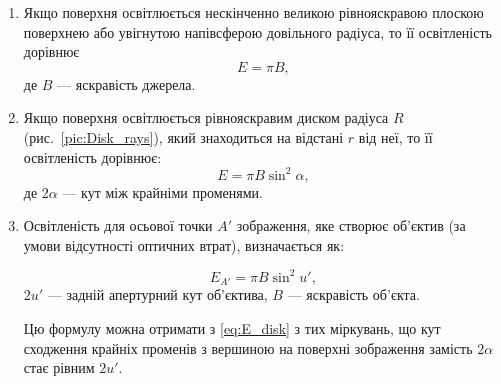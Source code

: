 \begin{enumerate}[label*={\textcolor{themecolordark}{\ding{90}}}]

	\item Якщо поверхня освітлюється нескінченно великою рівнояскравою
	      плоскою поверхнею або увігнутою напівсферою довільного радіуса, то її освітленість дорівнює
	      \begin{equation}\label{eq:E_inf_plane}
		      E = \pi B,
	      \end{equation}
	      де $B$ --- яскравість джерела.

	\item Якщо поверхня освітлюється  рівнояскравим диском радіуса $R$ (рис.~\ref{pic:Disk_rays}), який
	      знаходиться на відстані $r$ від неї, то її освітленість дорівнює:
	      \begin{equation}\label{eq:E_disk}
		      E = \pi B \sin^2\alpha,
	      \end{equation}
	      де $2\alpha$ --- кут між крайніми променями.

	      \begin{center}%
		      
		      \label{pic:Disk_rays}
	      \end{center}


	\item Освітленість для осьової точки $A'$ зображення, яке створює об’єктив (за умови відсутності оптичних втрат), визначається як:

	      \begin{equation}\label{eq:E_objective}
		      E_{A'} = \pi B \sin^2u',
	      \end{equation}
	      $2u'$ --- задній апертурний кут об’єктива, $B$ --- яскравість об’єкта.

	      Цю формулу можна отримати з \eqref{eq:E_disk} з тих міркувань, що кут сходження крайніх променів з вершиною на поверхні  зображення замість $2\alpha$ стає рівним $2u'$.

	      \begin{center}%
		      
		      \label{pic:Disk_rays}
	      \end{center}


\end{enumerate}
